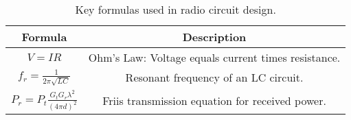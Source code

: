 \begin{table}[htbp]
    \centering
    \begin{tabular}{|c|c|}
        \hline
        \textbf{Formula} & \textbf{Description} \\
        \hline
        \( V = IR \) & Ohm's Law: Voltage equals current times resistance. \\
        \hline
        \( f_r = \frac{1}{2\pi\sqrt{LC}} \) & Resonant frequency of an LC circuit. \\
        \hline
        \( P_r = P_t \frac{G_t G_r \lambda^2}{(4\pi d)^2} \) & Friis transmission equation for received power. \\
        \hline
    \end{tabular}
    \caption{Key formulas used in radio circuit design.}
    \label{tab:radio-formulas}
\end{table}
